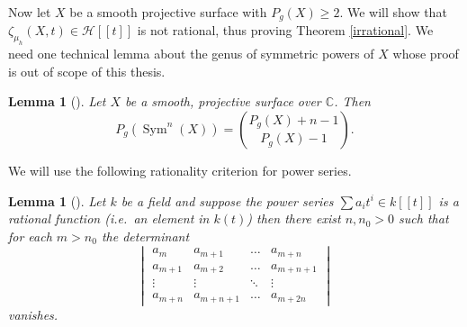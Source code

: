 \documentclass[11pt, a4paper, english, twoside]{article}
\theoremstyle{plain}
\newtheorem{lemma}[theorem]{Lemma}
\theoremstyle{definition}
\DeclareMathOperator{\Sym}{Sym}
\begin{document}
Now let $X$ be a smooth projective surface with $P_g(X) \geq 2$. We will show that $\zeta_{\mu_h}(X,t) \in \mathcal{H}[[t]]$ is not rational,
thus proving Theorem \ref{irrational}. We need one technical lemma about the genus of symmetric powers of $X$ whose proof is out of scope of this
thesis.

\begin{lemma}[{\cite[Lem. 3.8]{MR1996804}}]
    \label{genus}
    Let $X$ be a smooth, projective surface over $\mathbb{C}$. Then
    \[
        P_g(\Sym^n(X)) = \binom{P_g(X) + n - 1}{P_g(X) - 1}.
    \]
\end{lemma}

We will use the following rationality criterion for power series.

\begin{lemma}[{\cite[Lem. 3.1]{bruhat}}]
    Let $k$ be a field and suppose the power series $\sum a_it^i \in k[[t]]$  is a rational function (i.e.\ an element in $k(t)$) then
    there exist $n, n_0 > 0$ such that for each $m > n_0$ the determinant
    \[
        \begin{vmatrix}
            a_m     & a_{m+1} & \dots & a_{m+n} \\
            a_{m+1} & a_{m+2} & \dots & a_{m+n+1} \\
            \vdots  & \vdots  & \ddots & \vdots \\
            a_{m+n} & a_{m+n+1} & \dots & a_{m+2n}
        \end{vmatrix}
    \]
    vanishes.
\end{lemma}
\end{document}
